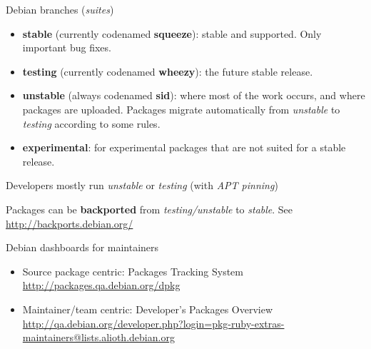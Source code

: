\documentclass[10pt,final]{beamer}
\begin{document}
\begin{frame}{Debian branches (\textsl{suites})}
  \begin{itemize}
  \item \textbf{stable} (currently codenamed \textbf{squeeze}): stable and
    supported. Only important bug fixes.  \br
  \item \textbf{testing} (currently codenamed \textbf{wheezy}): the future
    stable release.  \br
  \item \textbf{unstable} (always codenamed \textbf{sid}): where most of the
    work occurs, and where packages are uploaded. Packages migrate
    automatically from \textsl{unstable} to \textsl{testing} according to some
    rules.  \br
  \item \textbf{experimental}: for experimental packages that are not suited
    for a stable release.
  \end{itemize}
  \hbr 
  Developers mostly run \textsl{unstable} or \textsl{testing} (with
  \textsl{APT pinning}) \hbr
  
  Packages can be \textbf{backported} from \textsl{testing/unstable} to
  \textsl{stable}. See \url{http://backports.debian.org/}
\end{frame}

\begin{frame}{Debian dashboards for maintainers}
  \begin{itemize}
  \item Source package centric: Packages Tracking System\\
    \url{http://packages.qa.debian.org/dpkg}
    \br
  \item Maintainer/team centric: Developer's Packages Overview\\
    \url{http://qa.debian.org/developer.php?login=pkg-ruby-extras-maintainers@lists.alioth.debian.org}
  \end{itemize}
\end{frame}

\backupend
\end{document}
